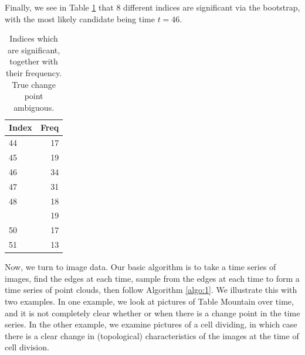 \documentclass[smallextended]{svjour3}       %
\begin{document}
\begin{example}
Finally, we see in Table \ref{tab:unnamed-chunk-3} that 8 different indices are significant via the bootstrap, with the most likely candidate being time $t = 46$. 

\begin{longtable}[t]{lr}
\caption{\label{tab:unnamed-chunk-3}Indices which are significant, together with their frequency. True change point ambiguous.}\\
\toprule
Index & Freq\\
\midrule
44 & 17\\
45 & 19\\
46 & 34\\
47 & 31\\
48 & 18\\
\addlinespace
49 & 19\\
50 & 17\\
51 & 13\\
\bottomrule
\end{longtable}
\end{example}

Now, we turn to image data. Our basic algorithm is to take a time series of images, find the edges at each time, sample from the edges at each time to form a time series of point clouds, then follow Algorithm \ref{algo:1}. We illustrate this with two examples. In one example, we look at pictures of Table Mountain over time, and it is not completely clear whether or when there is a change point in the time series. In the other example, we examine pictures of a cell dividing, in which case there is a clear change in (topological) characteristics of the images at the time of cell division. 
\end{document}
